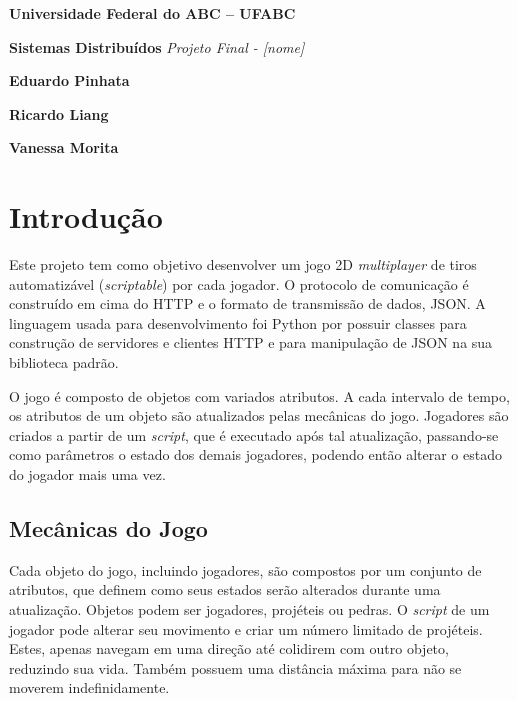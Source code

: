\documentclass[12pt,a4paper]{article}
\begin{document}
\pagestyle{plain}

\begin{titlepage}
\begin{center}
	\textbf{{\large Universidade Federal do ABC -- UFABC}}

	\textbf{\large Sistemas Distribuídos}
	\vfill
	\textit{\Large Projeto Final - [nome]}
	\vfill
	\begin{flushright}
		\textbf{\large Eduardo Pinhata}

		\textbf{\large Ricardo Liang}

		\textbf{\large Vanessa Morita}
	\end{flushright}
	\vfill
\end{center}
\end{titlepage}

\tableofcontents

\pagebreak \section{Introdução}

Este projeto tem como objetivo desenvolver um jogo 2D \textit{multiplayer} de
tiros automatizável (\textit{scriptable}) por cada jogador. O protocolo de
comunicação é construído em cima do HTTP e o formato de transmissão de dados,
JSON. A linguagem usada para desenvolvimento foi Python por possuir classes
para construção de servidores e clientes HTTP e para manipulação de JSON na sua
biblioteca padrão.

O jogo é composto de objetos com variados atributos. A cada intervalo de tempo,
os atributos de um objeto são atualizados pelas mecânicas do jogo. Jogadores
são criados a partir de um \textit{script}, que é executado após tal
atualização, passando-se como parâmetros o estado dos demais jogadores, podendo
então alterar o estado do jogador mais uma vez.

\subsection{Mecânicas do Jogo}

Cada objeto do jogo, incluindo jogadores, são compostos por um conjunto de
atributos, que definem como seus estados serão alterados durante uma
atualização.  Objetos podem ser jogadores, projéteis ou pedras. O
\textit{script} de um jogador pode alterar seu movimento e criar um número
limitado de projéteis.  Estes, apenas navegam em uma direção até colidirem com
outro objeto, reduzindo sua vida. Também possuem uma distância máxima para não
se moverem indefinidamente.
\end{document}
